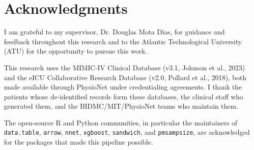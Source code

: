 \chapter*{Acknowledgments}

I am grateful to my supervisor, Dr. Douglas Mota Dias, for guidance and feedback throughout this research and to the
Atlantic Technological University (ATU) for the opportunity to pursue this work.

This research uses the MIMIC-IV Clinical Database
(v3.1, Johnson et al., 2023) and the eICU Collaborative Research Database
(v2.0, Pollard et al., 2018), both made available through PhysioNet under
credentialing agreements. I thank the patients whose de-identified records form
these databases, the clinical staff who generated them, and the BIDMC/MIT/PhysioNet
teams who maintain them.

The open-source R and Python communities, in particular the maintainers of
\texttt{data.table}, \texttt{arrow}, \texttt{nnet}, \texttt{xgboost},
\texttt{sandwich}, and \texttt{pmsampsize}, are acknowledged for the packages
that made this pipeline possible.
